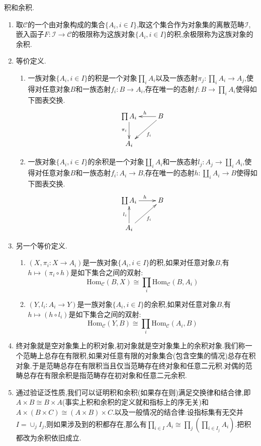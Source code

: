 积和余积.
\begin{enumerate}
	\item 取$\mathscr{C}$的一个由对象构成的集合$\{A_i,i\in I\}$,取这个集合作为对象集的离散范畴$\mathscr{I}$,嵌入函子$F:\mathscr{I}\to\mathscr{C}$的极限称为这族对象$\{A_i,i\in I\}$的积,余极限称为这族对象的余积.
	\item 等价定义.
	\begin{enumerate}
		\item 一族对象$\{A_i,i\in I\}$的积是一个对象$\prod_iA_i$以及一族态射$\pi_j:\prod_iA_i\to A_j$,使得对任意对象$B$和一族态射$f_i:B\to A_i$,存在唯一的态射$f:B\to\prod_iA_i$使得如下图表交换.
		$$\xymatrix{\prod A_i\ar[d]_{\pi_i}&B\ar[l]_{h}\ar[dl]^{f_i}\\A_i&}$$
		\item 一族对象$\{A_i,i\in I\}$的余积是一个对象$\coprod_iA_i$和一族态射$l_j:A_j\to\coprod_iA_i$,使得对任意对象$B$和一族态射$f_i:A_i\to B$,存在唯一的态射$h:\coprod_iA_i\to B$使得如下图表交换.
		$$\xymatrix{\coprod A_i\ar[r]^{h}&B\\A_i\ar[u]^{l_i}\ar[ur]_{f_i}&}$$
	\end{enumerate}
	\item 另一个等价定义.
	\begin{enumerate}
		\item $(X,\pi_i:X\to A_i)$是一族对象$\{A_i,i\in I\}$的积,如果对任意对象$B$,有$h\mapsto(\pi_i\circ h)$是如下集合之间的双射:
		$$\mathrm{Hom}_{\mathscr{C}}(B,X)\cong\prod_i\mathrm{Hom}_{\mathscr{C}}(B,A_i)$$
		\item $(Y,l_i:A_i\to Y)$是一族对象$\{A_i,i\in I\}$的余积,如果对任意对象$B$,有$h\mapsto(h\circ l_i)$是如下集合之间的双射:
		$$\mathrm{Hom}_{\mathscr{C}}(Y,B)\cong\prod_i\mathrm{Hom}_{\mathscr{C}}(A_i,B)$$
	\end{enumerate}
	\item 终对象就是空对象集上的积对象,初对象就是空对象集上的余积对象.我们称一个范畴上总存在有限积,如果对任意有限的对象集合(包含空集的情况)总存在积对象.于是范畴总存在有限积当且仅当范畴存在终对象和任意二元积.对偶的范畴总存在有限余积是指范畴存在初对象和任意二元余积.
	\item 通过验证泛性质,我们可以证明积和余积(如果存在则)满足交换律和结合律,即$A\times B\cong B\times A$(事实上积和余积的定义就和指标上的序无关)和$A\times(B\times C)\cong(A\times B)\times C$.以及一般情况的结合律:设指标集有无交并$I=\cup_jI_j$,则如果涉及到的积都存在,那么有$\prod_{i\in I}A_i\cong\prod_j\left(\prod_{i\in I_j}A_i\right)$.把积都改为余积依旧成立.
\end{enumerate}


